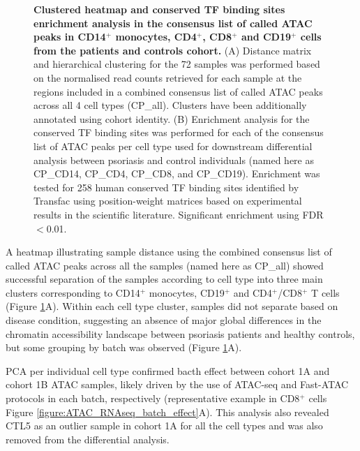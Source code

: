 \begin{figure}[htbp]
\caption[Clustered heatmap and conserved TF binding sites enrichment analysis in the consensus list of called ATAC peaks in CD14$^+$ monocytes, CD4$^+$, CD8$^+$ and CD19$^+$ cells from the patients and controls cohort.]{\textbf{Clustered heatmap and conserved TF binding sites enrichment analysis in the consensus list of called ATAC peaks in CD14$^+$ monocytes, CD4$^+$, CD8$^+$ and CD19$^+$ cells from the patients and controls cohort.} (A) Distance matrix and hierarchical clustering for the 72 samples was performed based on the normalised read counts retrieved for each sample at the regions included in a combined consensus list of called ATAC peaks across all 4 cell types (CP\_all). Clusters have been additionally annotated using cohort identity. (B) Enrichment analysis for the conserved TF binding sites was performed for each of the consensus list of ATAC peaks per cell type used for downstream differential analysis between psoriasis and control individuals (named here as CP\_CD14, CP\_CD4, CP\_CD8, and CP\_CD19). Enrichment was tested for 258 human conserved TF binding sites identified by Transfac using position-weight matrices based on experimental results in the scientific literature. Significant enrichment using FDR$<$0.01.}
\label{figure:ATAC_PS_CTL_heatmap_TFBS}
\end{figure}

A heatmap illustrating sample distance using the combined consensus list of called ATAC peaks across all the samples (named here as CP\_all) showed successful separation of the samples according to cell type into three main clusters corresponding to CD14$^+$ monocytes, CD19$^+$ and CD4$^+$/CD8$^+$ T cells (Figure \ref{figure:ATAC_PS_CTL_heatmap_TFBS}A). Within each cell type cluster, samples did not separate based on disease condition, suggesting an absence of major global differences in the chromatin accessibility landscape between psoriasis patients and healthy controls, but some grouping by batch was observed (Figure \ref{figure:ATAC_PS_CTL_heatmap_TFBS}A).

PCA per individual cell type confirmed bacth effect between cohort 1A and cohort 1B ATAC samples, likely driven by the use of ATAC-seq and Fast-ATAC protocols in each batch, respectively (representative example in CD8$^+$ cells Figure \ref{figure:ATAC_RNAseq_batch_effect}A). This analysis also revealed CTL5 as an outlier sample in cohort 1A for all the cell types and was also removed from the differential analysis.


